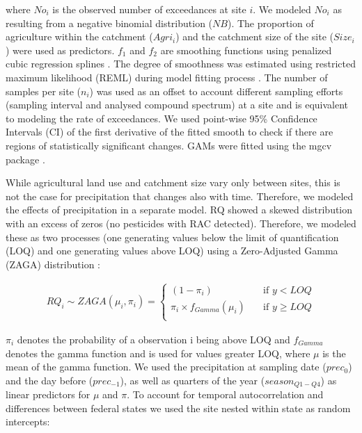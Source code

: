 \documentclass[journal=esthag,manuscript=article]{achemso}
\begin{document}
where $No_i$ is the observed number of exceedances at site $i$. 
We modeled $No_i$ as resulting from a negative binomial distribution ($NB$).
The proportion of agriculture within the catchment ($Agri_i$) and the catchment size of the site ($Size_i$) were used as predictors. 
$f_1$ and $f_2$ are smoothing functions using penalized cubic regression splines \citep{wood_generalized_2006}.
The degree of smoothness was estimated using restricted maximum likelihood (REML) during model fitting process \citep{wood_fast_2011}.
The number of samples per site ($n_i$) was used as an offset to account different sampling efforts (sampling interval and analysed compound spectrum) at a site and is equivalent to modeling the rate of exceedances. 
We used point-wise 95\% Confidence Intervals (CI) of the first derivative of the fitted smooth to check if there are regions of statistically significant changes.
GAMs were fitted using the mgcv package \citep{wood_fast_2011}.

While agricultural land use and catchment size vary only between sites, this is not the case for precipitation that changes also with time.
Therefore, we modeled the effects of precipitation in a separate model.
RQ showed a skewed distribution with an excess of zeros (no pesticides with RAC detected). 
Therefore, we modeled these as two processes (one generating values below the limit of quantification (LOQ) and one generating values above LOQ) using a Zero-Adjusted Gamma (ZAGA) distribution \cite{rigby_generalized_2005,stasinopoulos_gamlss.dist:_2016}:

\begin{align}
RQ_i \sim ZAGA(\mu_i, \pi_i) = 
  \begin{cases}
    (1 - \pi_i)   & \quad  \text{if } y < LOQ \\
    \pi_i \times f_{Gamma} (\mu_i) & \quad \text{if } y \ge LOQ \\
  \end{cases}
  \label{eqn:eqn3}
\end{align}

$\pi_i$ denotes the probability of a observation i being above LOQ and $f_{Gamma}$ denotes the gamma function and is used for values greater LOQ, where $\mu$ is the mean of the gamma function.
We used the precipitation at sampling date ($prec_0$) and the day before ($prec_{-1}$), as well as quarters of the year ($season_{Q1-Q4}$) as linear predictors for $\mu$ and $\pi$.
To account for temporal autocorrelation and differences between federal states we used the site nested within state as random intercepts:
\end{document}
